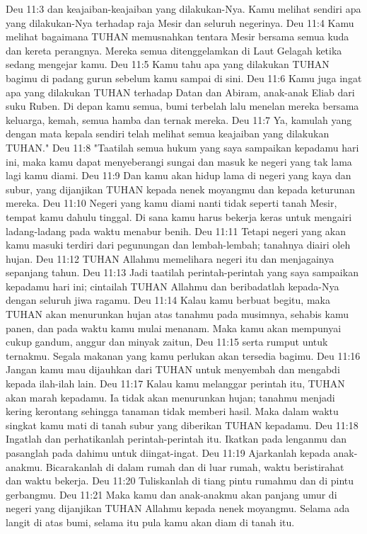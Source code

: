 Deu 11:3  dan keajaiban-keajaiban yang dilakukan-Nya. Kamu melihat sendiri apa yang dilakukan-Nya terhadap raja Mesir dan seluruh negerinya.
Deu 11:4  Kamu melihat bagaimana TUHAN memusnahkan tentara Mesir bersama semua kuda dan kereta perangnya. Mereka semua ditenggelamkan di Laut Gelagah ketika sedang mengejar kamu.
Deu 11:5  Kamu tahu apa yang dilakukan TUHAN bagimu di padang gurun sebelum kamu sampai di sini.
Deu 11:6  Kamu juga ingat apa yang dilakukan TUHAN terhadap Datan dan Abiram, anak-anak Eliab dari suku Ruben. Di depan kamu semua, bumi terbelah lalu menelan mereka bersama keluarga, kemah, semua hamba dan ternak mereka.
Deu 11:7  Ya, kamulah yang dengan mata kepala sendiri telah melihat semua keajaiban yang dilakukan TUHAN."
Deu 11:8  "Taatilah semua hukum yang saya sampaikan kepadamu hari ini, maka kamu dapat menyeberangi sungai dan masuk ke negeri yang tak lama lagi kamu diami.
Deu 11:9  Dan kamu akan hidup lama di negeri yang kaya dan subur, yang dijanjikan TUHAN kepada nenek moyangmu dan kepada keturunan mereka.
Deu 11:10  Negeri yang kamu diami nanti tidak seperti tanah Mesir, tempat kamu dahulu tinggal. Di sana kamu harus bekerja keras untuk mengairi ladang-ladang pada waktu menabur benih.
Deu 11:11  Tetapi negeri yang akan kamu masuki terdiri dari pegunungan dan lembah-lembah; tanahnya diairi oleh hujan.
Deu 11:12  TUHAN Allahmu memelihara negeri itu dan menjagainya sepanjang tahun.
Deu 11:13  Jadi taatilah perintah-perintah yang saya sampaikan kepadamu hari ini; cintailah TUHAN Allahmu dan beribadatlah kepada-Nya dengan seluruh jiwa ragamu.
Deu 11:14  Kalau kamu berbuat begitu, maka TUHAN akan menurunkan hujan atas tanahmu pada musimnya, sehabis kamu panen, dan pada waktu kamu mulai menanam. Maka kamu akan mempunyai cukup gandum, anggur dan minyak zaitun,
Deu 11:15  serta rumput untuk ternakmu. Segala makanan yang kamu perlukan akan tersedia bagimu.
Deu 11:16  Jangan kamu mau dijauhkan dari TUHAN untuk menyembah dan mengabdi kepada ilah-ilah lain.
Deu 11:17  Kalau kamu melanggar perintah itu, TUHAN akan marah kepadamu. Ia tidak akan menurunkan hujan; tanahmu menjadi kering kerontang sehingga tanaman tidak memberi hasil. Maka dalam waktu singkat kamu mati di tanah subur yang diberikan TUHAN kepadamu.
Deu 11:18  Ingatlah dan perhatikanlah perintah-perintah itu. Ikatkan pada lenganmu dan pasanglah pada dahimu untuk diingat-ingat.
Deu 11:19  Ajarkanlah kepada anak-anakmu. Bicarakanlah di dalam rumah dan di luar rumah, waktu beristirahat dan waktu bekerja.
Deu 11:20  Tuliskanlah di tiang pintu rumahmu dan di pintu gerbangmu.
Deu 11:21  Maka kamu dan anak-anakmu akan panjang umur di negeri yang dijanjikan TUHAN Allahmu kepada nenek moyangmu. Selama ada langit di atas bumi, selama itu pula kamu akan diam di tanah itu.
